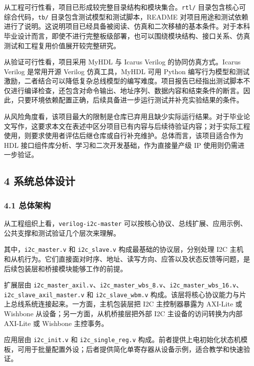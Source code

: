从工程可行性看，项目已形成较完整目录结构和模块集合。\texttt{rtl/} 目录包含核心可综合代码，\texttt{tb/} 目录包含测试模型和测试脚本，README 对项目用途和测试依赖进行了说明。这说明项目已经具备被阅读、仿真和二次移植的基本条件。对于本科毕业设计而言，即使不进行完整板级部署，也可以围绕模块结构、接口关系、仿真测试和工程复用价值展开较完整研究。

从验证可行性看，项目采用 MyHDL 与 Icarus Verilog 的协同仿真方式。Icarus Verilog 是常用开源 Verilog 仿真工具，MyHDL 可用 Python 编写行为模型和测试激励，二者结合可以降低复杂总线模型的编写难度。项目报告已经指出测试脚本不仅进行编译检查，还包含对命令输出、地址序列、数据内容和结束条件的断言。因此，只要环境依赖配置正确，后续具备进一步运行测试并补充实验结果的条件。

从风险角度看，该项目最大的限制是仓库已弃用且缺少实际运行结果。对于毕业论文写作，这要求本文在表述中区分项目已有内容与后续待验证内容；对于实际工程使用，则要求使用者评估后继仓库或自行补充维护。总体而言，该项目适合作为 HDL 接口组件库分析、学习和二次开发基础，作为直接量产级 IP 使用则仍需进一步验证。

\subsection{4 系统总体设计}\label{ux7cfbux7edfux603bux4f53ux8bbeux8ba1}

\subsubsection{4.1 总体架构}\label{ux603bux4f53ux67b6ux6784}

从工程组织上看，\texttt{verilog-i2c-master} 可以按核心协议、总线扩展、应用示例、公共支撑和测试验证几个层次来理解。

其中，\texttt{i2c\_master.v} 和 \texttt{i2c\_slave.v} 构成最基础的协议层，分别处理 I2C 主机和从机行为。它们直接面对时序、地址、读写方向、应答以及状态反馈等问题，是后续包装层和桥接模块能够工作的前提。

扩展层由 \texttt{i2c\_master\_axil.v}、\texttt{i2c\_master\_wbs\_8.v}、\texttt{i2c\_master\_wbs\_16.v}、\texttt{i2c\_slave\_axil\_master.v} 和 \texttt{i2c\_slave\_wbm.v} 构成。该层将核心协议能力与片上总线系统连接起来。一方面，主机包装层把 I2C 主控制器暴露为 AXI-Lite 或 Wishbone 从设备；另一方面，从机桥接层把外部 I2C 主设备的访问转换为内部 AXI-Lite 或 Wishbone 主控事务。

应用层由 \texttt{i2c\_init.v} 和 \texttt{i2c\_single\_reg.v} 构成。前者提供上电初始化状态机模板，可用于批量配置外设；后者提供简化单寄存器从设备示例，适合教学和快速验证。

